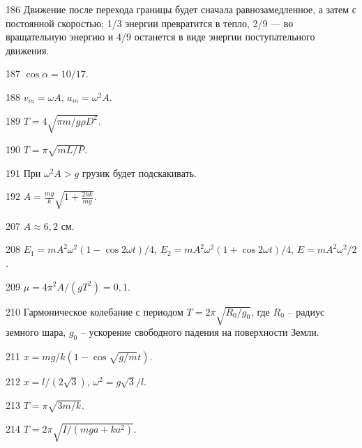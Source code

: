 \begin{Answer}{186}
Движение после перехода границы будет сначала равнозамедленное, а затем с постоянной скоростью; 1/3 энергии превратится в тепло, 2/9 — во вращательную энергию и 4/9 останется в виде энергии поступательного движения.
\end{Answer}
\begin{Answer}{187}
$\cos \alpha = 10/17$.
\end{Answer}
\begin{Answer}{188}
$v_m = \omega A$, $a_m = \omega^2 A$.
\end{Answer}
\begin{Answer}{189}
$T = 4 \sqrt{\pi m / g \rho D^2}$.
\end{Answer}
\begin{Answer}{190}
$T = \pi \sqrt{m L /P}$.
\end{Answer}
\begin{Answer}{191}
При $\omega^2 A > g$ грузик будет подскакивать.
\end{Answer}
\begin{Answer}{192}
$A = \frac{mg}{k}\sqrt{ 1 + \frac{2hk}{mg}}$.
\end{Answer}
\begin{Answer}{207}
$A \approx 6,2$ см.
\end{Answer}
\begin{Answer}{208}
$E_1 = m A^2 \omega^2 (1 - \cos 2 \omega t)/4$, $E_2 = m A^2 \omega^2 (1 + \cos 2 \omega t)/4$, $E = m A^2 \omega^2 /2$.
\end{Answer}
\begin{Answer}{209}
$\mu = 4 \pi^2 A / (gT^2) = 0,1$.
\end{Answer}
\begin{Answer}{210}
Гармоническое колебание с периодом $T = 2 \pi \sqrt{R_0 / g_0}$, где $R_0$ -- радиус земного шара, $g_0$ -- ускорение свободного падения на поверхности Земли.
\end{Answer}
\begin{Answer}{211}
$x = mg/k(1-\cos \sqrt{g/m} t)$.
\end{Answer}
\begin{Answer}{212}
$x = l/(2\sqrt{3})$, $\omega^2 = g\sqrt{3} / l$.
\end{Answer}
\begin{Answer}{213}
$T =  \pi\sqrt{3m/k}$.
\end{Answer}
\begin{Answer}{214}
$T = 2 \pi \sqrt{I/(mga + ka^2)}$.
\end{Answer}
